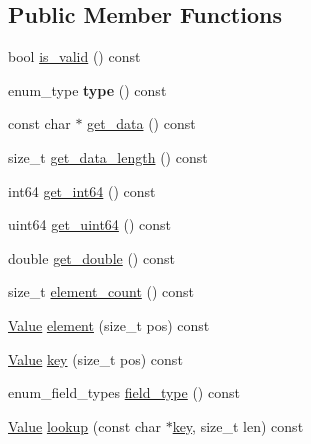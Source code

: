 \subsection*{Public Member Functions}
\begin{DoxyCompactItemize}
\item 
bool \mbox{\hyperlink{classjson__binary_1_1Value_af156297a9b0f2584f5986e899bf12c6c}{is\+\_\+valid}} () const
\item 
\mbox{\label{classjson__binary_1_1Value_a8dc4e71426348bdac199b54fb6a17691}} 
enum\+\_\+type {\bfseries type} () const
\item 
const char $\ast$ \mbox{\hyperlink{classjson__binary_1_1Value_a8691a2514d0bdd2a1f5c39c87ccab132}{get\+\_\+data}} () const
\item 
size\+\_\+t \mbox{\hyperlink{classjson__binary_1_1Value_a89cd66f8f33d58a241999aa4446ebd72}{get\+\_\+data\+\_\+length}} () const
\item 
int64 \mbox{\hyperlink{classjson__binary_1_1Value_aac42ffa1dc718f9b86a173f0c9fdefa2}{get\+\_\+int64}} () const
\item 
uint64 \mbox{\hyperlink{classjson__binary_1_1Value_a26f39e9400007bb4df9461858a45e4ed}{get\+\_\+uint64}} () const
\item 
double \mbox{\hyperlink{classjson__binary_1_1Value_ac0e1aaddd94b4e96ef8e595a503dd5f2}{get\+\_\+double}} () const
\item 
size\+\_\+t \mbox{\hyperlink{classjson__binary_1_1Value_aa45a919f10c1421d765ecfbc8491aa95}{element\+\_\+count}} () const
\item 
\mbox{\hyperlink{classjson__binary_1_1Value}{Value}} \mbox{\hyperlink{classjson__binary_1_1Value_acea99f0727f240b2ec552a8fae60855d}{element}} (size\+\_\+t pos) const
\item 
\mbox{\hyperlink{classjson__binary_1_1Value}{Value}} \mbox{\hyperlink{classjson__binary_1_1Value_a10443a279b53069820d5f0c426a046db}{key}} (size\+\_\+t pos) const
\item 
enum\+\_\+field\+\_\+types \mbox{\hyperlink{classjson__binary_1_1Value_acd6727baec7b2a35aed4ea9683d7dfe9}{field\+\_\+type}} () const
\item 
\mbox{\hyperlink{classjson__binary_1_1Value}{Value}} \mbox{\hyperlink{classjson__binary_1_1Value_a5bfd3f9c95980a2565ea9bcf35392c03}{lookup}} (const char $\ast$\mbox{\hyperlink{classjson__binary_1_1Value_a10443a279b53069820d5f0c426a046db}{key}}, size\+\_\+t len) const
\item 

\end{DoxyCompactItemize}
